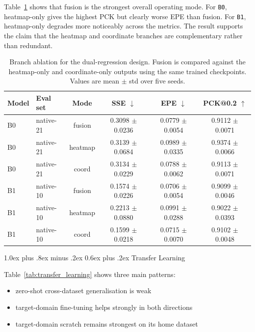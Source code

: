 \documentclass[10pt,letterpaper]{article}
\makeatletter
\renewcommand\subsection{\@startsection{subsection}{2}{\z@}%
  {1.0ex plus .8ex minus .2ex}%
  {0.6ex plus .2ex}%
  {\normalfont\itshape}}
\makeatother
\begin{document}
Table~\ref{tab:branch_ablation} shows that fusion is the strongest overall operating mode. For \texttt{B0}, heatmap-only gives the highest PCK but clearly worse EPE than fusion. For \texttt{B1}, heatmap-only degrades more noticeably across the metrics. The result supports the claim that the heatmap and coordinate branches are complementary rather than redundant.

\begin{table}[H]
\centering
\footnotesize
\caption{Branch ablation for the dual-regression design. Fusion is compared against the heatmap-only and coordinate-only outputs using the same trained checkpoints. Values are mean $\pm$ std over five seeds.}
\label{tab:branch_ablation}
\begin{tabular}{llcccc}
\toprule
Model & Eval set & Mode & SSE $\downarrow$ & EPE $\downarrow$ & PCK@0.2 $\uparrow$ \\
\midrule
B0 & native-21 & fusion & 0.3098 $\pm$ 0.0236 & 0.0779 $\pm$ 0.0054 & 0.9112 $\pm$ 0.0071 \\
B0 & native-21 & heatmap & 0.3139 $\pm$ 0.0684 & 0.0989 $\pm$ 0.0335 & 0.9374 $\pm$ 0.0066 \\
B0 & native-21 & coord & 0.3134 $\pm$ 0.0229 & 0.0788 $\pm$ 0.0062 & 0.9113 $\pm$ 0.0071 \\
B1 & native-10 & fusion & 0.1574 $\pm$ 0.0226 & 0.0706 $\pm$ 0.0054 & 0.9099 $\pm$ 0.0046 \\
B1 & native-10 & heatmap & 0.2213 $\pm$ 0.0880 & 0.0991 $\pm$ 0.0288 & 0.9022 $\pm$ 0.0393 \\
B1 & native-10 & coord & 0.1599 $\pm$ 0.0218 & 0.0715 $\pm$ 0.0070 & 0.9102 $\pm$ 0.0048 \\
\bottomrule
\end{tabular}
\end{table}

\subsection{Transfer Learning}

Table~\ref{tab:transfer_learning} shows three main patterns:
\begin{itemize}
\item zero-shot cross-dataset generalisation is weak
\item target-domain fine-tuning helps strongly in both directions
\item target-domain scratch remains strongest on its home dataset
\end{itemize}
\end{document}
